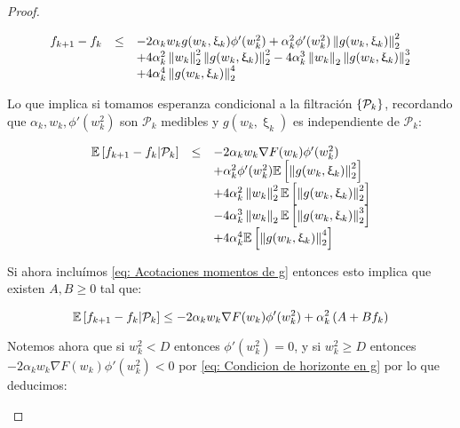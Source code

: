 \begin{proof}
\begin{enumerate}
		\begin{equation*}
		\begin{array}{rcl}
		f_{k+1} - f_k & \leq & -2 \alpha_k w_k g(w_k, \upxi_{k}) \phi'(w_k^2)  + \alpha_k^2 \phi'(w_k^2) \left\lVert g(w_k, \upxi_{k})\right\rVert_2^2 \\ 
		& & + 4 \alpha_k^2 \left\lVert w_k\right\rVert_2^2 \left\lVert g(w_k, \upxi_{k})\right\rVert_2^2 -4 \alpha_k^3 \left\lVert w_k\right\rVert_2 \left\lVert g(w_k, \upxi_{k})\right\rVert_2^3  \\
		& & + 4 \alpha_k^4 \left\lVert g(w_k, \upxi_{k})\right\rVert_2^4 \\
		\end{array}
		\end{equation*}
		
		Lo que implica si tomamos esperanza condicional a la filtraci\'on $\left\lbrace\mathcal{P}_k\right\rbrace$, recordando que $\alpha_k, w_k, \phi'(w_k^2)$ son $\mathcal{P}_k$ medibles y $g(w_k, \upxi_{k})$ es independiente de $\mathcal{P}_k$:
		
		\begin{equation*}
		\begin{array}{rcl}
		\mathbb{E} \left[{f_{k+1} - f_k} \vert \mathcal{P}_{k}\right] & \leq & -2 \alpha_k w_k \nabla F (w_k)\phi'(w_k^2) \\ 
		&& + \alpha_k^2 \phi'(w_k^2) \mathbb{E} \left[\left\lVert g(w_k, \upxi_{k})\right\rVert_2^2\right] \\ 
		& & + 4 \alpha_k^2 \left\lVert w_k\right\rVert_2^2 \mathbb{E} \left[\left\lVert g(w_k, \upxi_{k})\right\rVert_2^2\right] \\
		& & -4 \alpha_k^3 \left\lVert w_k\right\rVert_2 \mathbb{E} \left[\left\lVert g(w_k, \upxi_{k})\right\rVert_2^3\right]  \\
		& & + 4 \alpha_k^4 \mathbb{E} \left[\left\lVert g(w_k, \upxi_{k})\right\rVert_2^4\right] \\
		\end{array}
		\end{equation*}
		
		
		Si ahora inclu\'imos \ref{eq: Acotaciones momentos de g} entonces esto implica que existen $A,B \geq 0$ tal que:
		
		\begin{equation*}
		\mathbb{E} \left[{f_{k+1} - f_k} \vert \mathcal{P}_{k}\right] \leq -2 \alpha_k w_k \nabla F (w_k)\phi'(w_k^2)  + \alpha_k^2\left(A + B f_k\right)
		\end{equation*}
		
		Notemos ahora que si $w_k^2 < D$ entonces $\phi'(w_k^2) = 0$, y si $w_k^2 \geq D$ entonces $-2 \alpha_k w_k \nabla F (w_k)\phi'(w_k^2) < 0$ por \ref{eq: Condicion de horizonte en g} por lo que deducimos:
		

\end{enumerate}
\end{proof}

